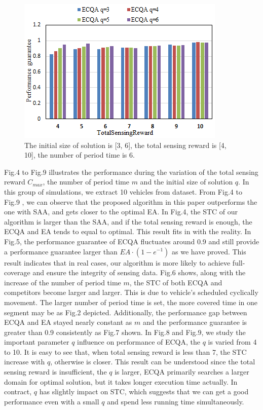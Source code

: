 \documentclass[journal]{IEEEtran}
\begin{document}
\begin{figure}
	\centering
	\includegraphics[width=1\linewidth]{Fig4(f).png}
	\caption{The initial size of solution is [3, 6], the total sensing reward is [4, 10], the number of period time is 6.}
	\label{fig:figure5}
\end{figure}
Fig.4 to Fig.9 illustrates the performance during the variation of the total sensing reward $C_{max}$, the number of period time $m$ and the initial size of solution $q$. In this group of simulations, we extract 10 vehicles from dataset. From Fig.4 to Fig.9 , we can observe that the proposed algorithm in this paper outperforms the one with SAA, and gets closer to the optimal EA. In Fig.4, the STC of our algorithm is larger than the SAA, and if the total sensing reward is enough, the ECQA and EA tends to equal to optimal. This result fits in with the reality. In Fig.5, the performance guarantee of ECQA fluctuates around 0.9 and still provide a performance guarantee larger than $EA\cdot(1-e^{-1})$ as we have proved. This result indicates that in real cases, our algorithm is more likely to achieve full-coverage and ensure the integrity of sensing data. Fig.6 shows, along with the increase of the number of period time $m$, the STC of both ECQA and competitors become larger and larger. This is due to vehicle's scheduled cyclically movement. The larger number of period time is set, the more covered time in one segment may be as Fig.2 depicted. Additionally, the performance gap between ECQA and EA stayed nearly constant as $m$ and the performance guarantee is greater than 0.9 consistently as Fig.7 shown. In Fig.8 and Fig.9, we study the important parameter $q$ influence on performance of ECQA, the $q$ is varied from 4 to 10. It is easy to see that, when total sensing reward is less than 7, the STC increase with $q$, otherwise is closer. This result can be understood since the total sensing reward is insufficient, the $q$ is larger, ECQA primarily searches a larger domain for optimal solution, but it takes longer execution time actually. In contract, $q$ has slightly impact on STC, which suggests that we can get a good performance even with a small $q$ and spend less running time simultaneously. 
\end{document}
